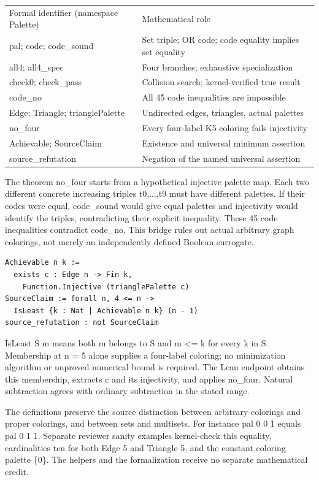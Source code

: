 \documentclass[10pt]{article}
\begin{document}
\begin{tabular}{ll}
Formal identifier (namespace Palette) & Mathematical role \\
pal; code; code\_sound & Set triple; OR code; code equality implies set equality \\
all4; all4\_spec & Four branches; exhaustive specialization \\
check0; check\_pass & Collision search; kernel-verified true result \\
code\_no & All 45 code inequalities are impossible \\
Edge; Triangle; trianglePalette & Undirected edges, triangles, actual palettes \\
no\_four & Every four-label K5 coloring fails injectivity \\
Achievable; SourceClaim & Existence and universal minimum assertion \\
source\_refutation & Negation of the named universal assertion \\
\end{tabular}\par\medskip
The theorem no\_four starts from a hypothetical injective palette map. Each two different concrete increasing triples t0,...,t9 must have different palettes. If their codes were equal, code\_sound would give equal palettes and injectivity would identify the triples, contradicting their explicit inequality. These 45 code inequalities contradict code\_no. This bridge rules out actual arbitrary graph colorings, not merely an independently defined Boolean surrogate.


\begin{verbatim}
Achievable n k :=
  exists c : Edge n -> Fin k,
    Function.Injective (trianglePalette c)
SourceClaim := forall n, 4 <= n ->
  IsLeast {k : Nat | Achievable n k} (n - 1)
source_refutation : not SourceClaim
\end{verbatim}
IsLeast S m means both m belongs to S and m <= k for every k in S. Membership at n = 5 alone supplies a four-label coloring; no minimization algorithm or unproved numerical bound is required. The Lean endpoint obtains this membership, extracts c and its injectivity, and applies no\_four. Natural subtraction agrees with ordinary subtraction in the stated range.


The definitions preserve the source distinction between arbitrary colorings and proper colorings, and between sets and multisets. For instance pal 0 0 1 equals pal 0 1 1. Separate reviewer sanity examples kernel-check this equality, cardinalities ten for both Edge 5 and Triangle 5, and the constant coloring palette \{0\}. The helpers and the formalization receive no separate mathematical credit.
\end{document}
